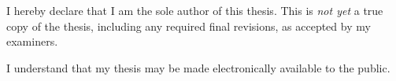 
\chapter*{}

\mbox{}\vfill

I hereby declare that I am the sole author of this thesis.
This is \emph{not yet} a true copy of the thesis, including any required final revisions, as accepted by my examiners.

I understand that my thesis may be made electronically available to the public.

\vfill
\vfill

\restoregeometry
